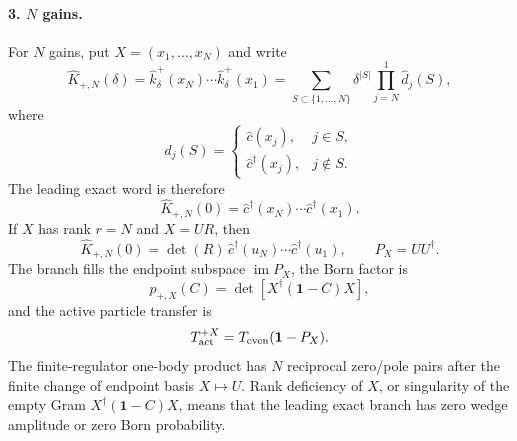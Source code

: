 \documentclass[aps,prb,onecolumn,nofootinbib,superscriptaddress]{revtex4-2}
\newcommand{\I}{\mathbf{1}}
\theoremstyle{plain}
\theoremstyle{definition}
\begin{document}
\paragraph*{3. \(N\) gains.}
For \(N\) gains, put \(X=(x_1,\ldots,x_N)\) and write
\begin{equation}
  \hat K_{+,N}(\delta)
  =
  \hat k_\delta^+(x_N)\cdots\hat k_\delta^+(x_1)
  =
  \sum_{S\subset\{1,\ldots,N\}}
  \delta^{|S|}
  \prod_{j=N}^{1} \hat d_j(S),
  \label{eq:N-gain-subset-expansion}
\end{equation}
where
\begin{equation}
  \hat d_j(S)=
  \begin{cases}
    \hat c(x_j), & j\in S,\\
    \hat c^\dagger(x_j), & j\notin S .
  \end{cases}
  \label{eq:N-gain-subset-operator}
\end{equation}
The leading exact word is therefore
\begin{equation}
  \hat K_{+,N}(0)
  =
  \hat c^\dagger(x_N)\cdots\hat c^\dagger(x_1).
  \label{eq:N-gain-leading-word}
\end{equation}
If \(X\) has rank \(r=N\) and \(X=UR\), then
\begin{equation}
  \hat K_{+,N}(0)
  =
  \det(R)\,
  \hat c^\dagger(u_N)\cdots\hat c^\dagger(u_1),
  \qquad
  P_X=UU^\dagger .
  \label{eq:N-gain-qr-endpoint}
\end{equation}
The branch fills the endpoint subspace \(\operatorname{im}P_X\), the Born
factor is
\begin{equation}
  p_{+,X}(C)=\det\!\left[X^\dagger(\I-C)X\right],
  \label{eq:N-gain-born}
\end{equation}
and the active particle transfer is
\begin{equation}
  T_{\rm act}^{+X}=T_{\rm even}(\I-P_X).
  \label{eq:N-gain-active-transfer}
\end{equation}
The finite-regulator one-body product has \(N\) reciprocal zero/pole pairs
after the finite change of endpoint basis \(X\mapsto U\).  Rank deficiency of
\(X\), or singularity of the empty Gram \(X^\dagger(\I-C)X\), means that the
leading exact branch has zero wedge amplitude or zero Born probability.
\end{document}
